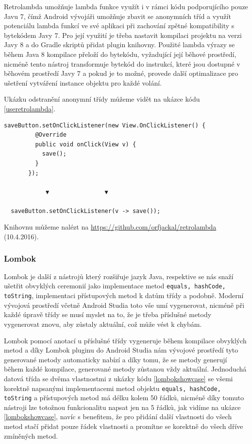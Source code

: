 \documentclass[czech,master,public,dept460,male,java,cpdeclaration]{diploma}
\begin{document}
Retrolambda umožňuje lambda funkce využít i v rámci kódu podporujícího pouze Javu 7,
čímž Android vývojáři umožňuje zbavit se anonymních tříd a využít potenciálu lambda funkcí
ve své aplikaci při zachování zpětné kompatibility s bytekódem Javy 7. Pro její využití je třeba
nastavit kompilaci projektu na verzi Javy 8 a do Gradle skriptů přidat plugin knihovny. Použité
lambda výrazy se během Java 8 kompilace přeloží do bytekódu, vyžadující její běhové prostředí,
nicméně tento nástroj transformuje bytekód do instrukcí, které jsou dostupné v běhovém prostředí
Javy 7 a pokud je to možné, provede další optimalizace pro ušetření vytváření instance objektu
pro každé volání.

Ukázku odstranění anonymní třídy můžeme vidět na ukázce kódu \ref{useretrolambda}.

\begin{lstlisting}[label=useretrolambda,caption=Odstrnění kódu anonymní třídy pomocí knihovny Retrolambda]
   saveButton.setOnClickListener(new View.OnClickListener() {
         @Override
         public void onClick(View v) {
           save();
         }
       });

            ▼                ▼

  saveButton.setOnClickListener(v -> save());
\end{lstlisting}

Knihovnu můžeme nalézt na \url{https://github.com/orfjackal/retrolambda}  (10.4.2016).

\subsubsection{Lombok}
Lombok je další z nástrojů který rozšiřuje jazyk Java, respektive se nás snaží ušetřit obvyklých
ceremonií jako implementace metod \texttt{equals, hashCode, toString}, implementaci přístupových
metod k datům třídy a podobně. Moderní vývojová prostředí včetně Android Studia toto vše umí
vygenerovat, nicméně při každé úpravě třídy se musí myslet na to, že je třeba příslušné metody
vygenerovat znovu, aby zůstaly aktuální, což může vést k chybám.

Lombok pomocí anotací u příslušné třídy vygeneruje během kompilace obvyklých metod a díky Lombok
pluginu do Android Studia nám vývojové prostředí tyto generované metody automaticky nabízí a díky tomu,
že se metody generují během každé kompilace, generované metody zůstanou vždy aktuální. Jednoduchá datová
třída se dvěma vlastnostmi z ukázky kódu \ref{lombokshowcase} se všemi korektně napsanými implementacemi
metod objektu \texttt{equals, hashCode, toString} a přístupových metod má délku kolem 50 řádků, nicméně
díky tomuto nástroji lze totožnou funkcionalitu napsat jen na 5 řádků, jak vidíme na ukázce \ref{lombokshowcase},
navíc s benefitem, že pro přidání další vlastnosti do všech metod stačí přidat pouze řádek vlastnosti
a promítne se korektně do všech dříve zmíněných metod.
\end{document}
